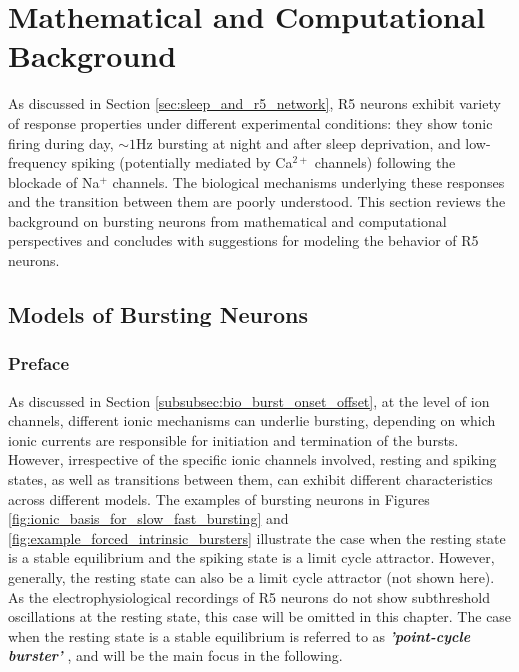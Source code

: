 \documentclass[../main.tex]{subfiles}
\begin{document}

\section{Mathematical and Computational Background} \label{sec:math_background}

As discussed in Section \ref{sec:sleep_and_r5_network}, R5 neurons exhibit variety of response properties under different experimental conditions: they show tonic firing during day, $\sim1$Hz bursting at night and after sleep deprivation, and low-frequency spiking (potentially mediated by Ca$^{2+}$ channels) following the blockade of Na$^+$ channels. The biological mechanisms underlying these responses and the transition between them are poorly understood. This section reviews the background on bursting neurons from mathematical and computational perspectives and concludes with suggestions for modeling the behavior of R5 neurons.

\subsection{Models of Bursting Neurons}

\subsubsection{Preface} \label{subsubsec:bursting_models_preface}

As discussed in Section \ref{subsubsec:bio_burst_onset_offset}, at the level of ion channels, different ionic mechanisms can underlie bursting, depending on which ionic currents are responsible for initiation and termination of the bursts.
However, irrespective of the specific ionic channels involved, resting and spiking states, as well as transitions between them, can exhibit different characteristics across different models. The examples of bursting neurons in Figures \ref{fig:ionic_basis_for_slow_fast_bursting}
and \ref{fig:example_forced_intrinsic_bursters} illustrate the case when the resting
state is a stable equilibrium and the spiking state is a limit cycle attractor. However,
generally, the resting state can also be a limit cycle attractor (not shown here).
As the electrophysiological recordings of R5 neurons do not show subthreshold oscillations
at the resting state, this case will be omitted in this chapter. The case when the resting state
is a stable equilibrium is referred to as \textbf{\textit{'point-cycle burster'}}
\parencite{izhikevichNEURALEXCITABILITYSPIKING2000}, and will be the main focus in the following.
\end{document}
